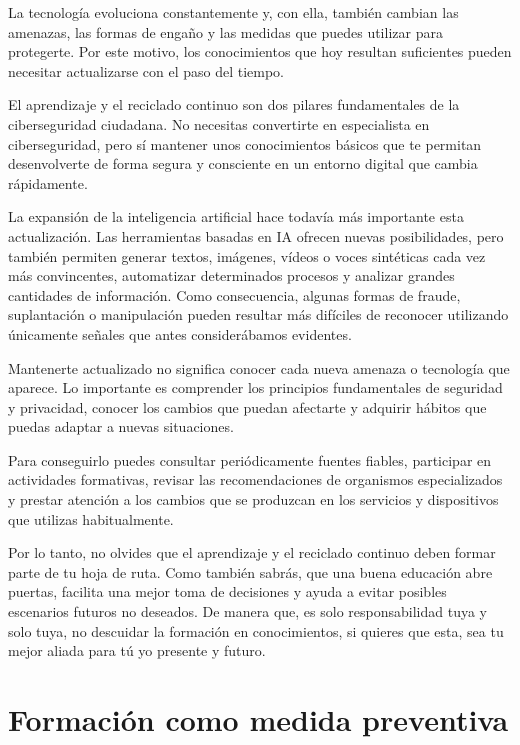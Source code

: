 \documentclass[
  spanish,
  a4paper,
  openany]{book}
\begin{document}
La tecnología evoluciona constantemente y, con ella, también cambian las amenazas, las formas de engaño y las medidas que puedes utilizar para protegerte. Por este motivo, los conocimientos que hoy resultan suficientes pueden necesitar actualizarse con el paso del tiempo.

El aprendizaje y el reciclado continuo son dos pilares fundamentales de la ciberseguridad ciudadana. No necesitas convertirte en especialista en ciberseguridad, pero sí mantener unos conocimientos básicos que te permitan desenvolverte de forma segura y consciente en un entorno digital que cambia rápidamente.

La expansión de la inteligencia artificial hace todavía más importante esta actualización. Las herramientas basadas en IA ofrecen nuevas posibilidades, pero también permiten generar textos, imágenes, vídeos o voces sintéticas cada vez más convincentes, automatizar determinados procesos y analizar grandes cantidades de información. Como consecuencia, algunas formas de fraude, suplantación o manipulación pueden resultar más difíciles de reconocer utilizando únicamente señales que antes considerábamos evidentes.

Mantenerte actualizado no significa conocer cada nueva amenaza o tecnología que aparece. Lo importante es comprender los principios fundamentales de seguridad y privacidad, conocer los cambios que puedan afectarte y adquirir hábitos que puedas adaptar a nuevas situaciones.

Para conseguirlo puedes consultar periódicamente fuentes fiables, participar en actividades formativas, revisar las recomendaciones de organismos especializados y prestar atención a los cambios que se produzcan en los servicios y dispositivos que utilizas habitualmente.

Por lo tanto, no olvides que el aprendizaje y el reciclado continuo deben formar parte de tu hoja de ruta. Como también sabrás, que una buena educación abre puertas, facilita una mejor toma de decisiones y ayuda a evitar posibles escenarios futuros no deseados. De manera que, es solo responsabilidad tuya y solo tuya, no descuidar la formación en conocimientos, si quieres que esta, sea tu mejor aliada para tú yo presente y futuro.

\section{Formación como medida preventiva}\label{formaciuxf3n-como-medida-preventiva}
\end{document}
